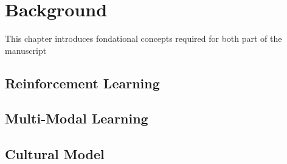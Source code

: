 \chapter{Background}

This chapter introduces fondational concepts required for both part of the manuscript
\section{Reinforcement Learning}
\section{Multi-Modal Learning}
\section{Cultural Model}